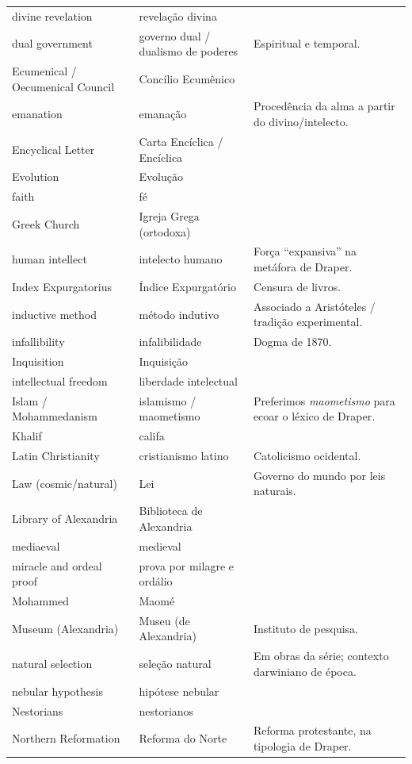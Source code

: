 \documentclass[11pt,a5paper,twoside,openany]{book}
\begin{document}
\begin{longtable}{p{} | p{} | p{}}
divine revelation & revelação divina &  \\
dual government & governo dual / dualismo de poderes & Espiritual e temporal. \\
Ecumenical / Oecumenical Council & Concílio Ecumênico &  \\
emanation & emanação & Procedência da alma a partir do divino/intelecto. \\
Encyclical Letter & Carta Encíclica / Encíclica &  \\
Evolution & Evolução &  \\
faith & fé &  \\
Greek Church & Igreja Grega (ortodoxa) &  \\
human intellect & intelecto humano & Força “expansiva” na metáfora de Draper. \\
Index Expurgatorius & Índice Expurgatório & Censura de livros. \\
inductive method & método indutivo & Associado a Aristóteles / tradição experimental. \\
infallibility & infalibilidade & Dogma de 1870. \\
Inquisition & Inquisição &  \\
intellectual freedom & liberdade intelectual &  \\
Islam / Mohammedanism & islamismo / maometismo & Preferimos \textit{maometismo} para ecoar o léxico de Draper. \\
Khalif & califa &  \\
Latin Christianity & cristianismo latino & Catolicismo ocidental. \\
Law (cosmic/natural) & Lei & Governo do mundo por leis naturais. \\
Library of Alexandria & Biblioteca de Alexandria &  \\
mediaeval & medieval &  \\
miracle and ordeal proof & prova por milagre e ordálio &  \\
Mohammed & Maomé &  \\
Museum (Alexandria) & Museu (de Alexandria) & Instituto de pesquisa. \\
natural selection & seleção natural & Em obras da série; contexto darwiniano de época. \\
nebular hypothesis & hipótese nebular &  \\
Nestorians & nestorianos &  \\
Northern Reformation & Reforma do Norte & Reforma protestante, na tipologia de Draper. \\

\end{longtable}
\end{document}
